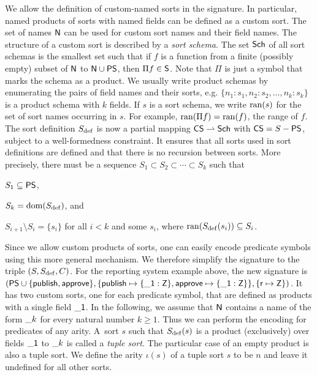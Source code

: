 We allow the definition of custom-named sorts in the signature.
%
In particular, named products of sorts with named fields can be defined as a custom sort.
The set of names $\mathsf{N}$ can be used for custom sort names and their field
names.
The structure of a custom sort is described by a \emph{sort schema}.
The set $\mathsf{Sch}$ of all sort schemas is the smallest set such that if $f$ is a function from a finite (possibly empty) subset of $\mathsf{N}$ to $\mathsf{N} \cup \mathsf{PS}$, then $\Pi f \in \mathsf{S}$. Note that $\Pi$ is just a symbol that marks the schema as a product. We usually write product schemas by enumerating the pairs of field names and their sorts, e.g. $\{n_1: s_1, n_2: s_2, \dots, n_k: s_k\}$ is a product schema with $k$ fields. If $s$ is a sort schema, we write $\operatorname{ran}(s)$ for the set of sort names occurring in $s$. For example, $\operatorname{ran}(\Pi f) = \operatorname{ran}(f)$, the range of $f$. The sort definition $S_{\mathrm{def}}$ is now a partial mapping $\mathsf{CS} \rightharpoonup \mathsf{Sch}$ with $\mathsf{CS} = S - \mathsf{PS}$, subject to a well-formedness constraint. It ensures that all sorts used in sort definitions are defined and that there is no recursion between sorts.
More precisely, there must be a sequence $S_1 \subset S_2 \subset \cdots \subset S_k$ such that
\begin{compactitem}
	\item $S_1 \subseteq \mathsf{PS}$,
	\item $S_k = \operatorname{dom}(S_{\mathrm{def}})$, and
	\item $S_{i+1}\setminus S_i = \{s_i\}$ for all $i < k$ and some $s_i$, where $\operatorname{ran}(S_{\mathrm{def}}(s_i)) \subseteq S_i$.
\end{compactitem}

Since we allow custom products of sorts, one can easily encode predicate symbols using this more
general mechanism. We therefore simplify the signature to the triple $(S, S_{\mathrm{def}}, C)$.
For the reporting system example above, the new signature is
$(\mathsf{PS}\cup\{\mathsf{publish},\mathsf{approve}\}, \{\mathsf{publish} \mapsto \{\mathsf{\_1}: \mathsf{Z}\}, \mathsf{approve} \mapsto \{\mathsf{\_1}: \mathsf{Z}\}\},
	\{\mathsf{r} \mapsto \mathsf{Z}\})$.
It has two custom sorts, one for each predicate symbol, that are defined as products with a single field $\mathsf{\_1}$.
In the following, we assume that $\mathsf{N}$ contains a name of the form $\mathsf{\_}k$ for every natural number $k \geq 1$.
Thus we can perform the encoding for predicates of any arity.
A~sort $s$ such that $S_{\mathrm{def}}(s)$ is a product (exclusively) over fields $\mathsf{\_1}$ to $\mathsf{\_}k$ is called a \emph{tuple sort}.
The particular case of an empty product is also a tuple sort.
We define the arity $\iota(s)$ of a tuple sort $s$ to be $n$ and leave it undefined for all other sorts.

